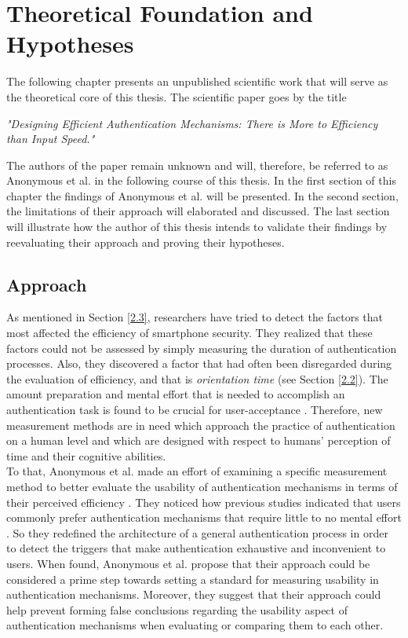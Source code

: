 
\chapter{Theoretical Foundation and Hypotheses}\label{ch:third}


The following chapter presents an unpublished scientific work that will serve as the theoretical core of this thesis. The scientific paper goes by the title 
\begin{center}
 \textit{"Designing Efficient Authentication Mechanisms: There is More to Efficiency than Input Speed."}   
\end{center}
The authors of the paper remain unknown and will, therefore, be referred to as Anonymous et al. \cite{anonymous} in the following course of this thesis. In the first section of this chapter the findings of Anonymous et al. \cite{anonymous} will be presented. In the second section, the limitations of their approach will elaborated and discussed. The last section will illustrate how the author of this thesis intends to validate their findings by reevaluating their approach and proving their hypotheses.

\section{Approach}

As mentioned in Section \ref{2.3}, researchers have tried to detect the factors that most affected the efficiency of smartphone security. They realized that these factors could not be assessed by simply measuring the duration of authentication processes. Also, they discovered a factor that had often been disregarded during the evaluation of efficiency, and that is \textit{orientation time} (see Section \ref{2.2}). The amount preparation and mental effort that is needed to accomplish an authentication task is found to be crucial for user-acceptance \cite{anonymous}. Therefore, new measurement methods are in need which approach the practice of authentication on a human level and which are designed with respect to humans' perception of time and their cognitive abilities. \\

To that, Anonymous et al. \cite{anonymous} made an effort of examining a specific measurement method to better evaluate the usability of authentication mechanisms in terms of their perceived efficiency \cite{anonymous}. They noticed how previous studies indicated that users commonly prefer authentication mechanisms that require little to no mental effort \cite{anonymous, AnatomySmartphone}. So they redefined the architecture of a general authentication process in order to detect the triggers that make authentication exhaustive and inconvenient to users. When found, Anonymous et al. \cite{anonymous} propose that their approach could be considered a prime step towards setting a standard for measuring usability in authentication mechanisms. Moreover, they suggest that their approach could help prevent forming false conclusions regarding the usability aspect of authentication mechanisms when evaluating or comparing them to each other.  \\

